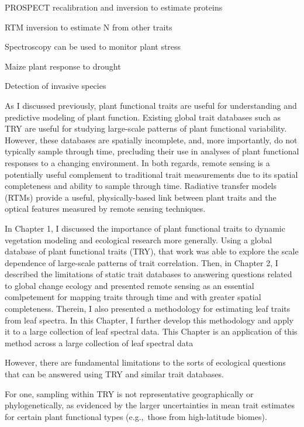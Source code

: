   PROSPECT recalibration and inversion to estimate proteins \cite{wang_2015_applicability}

  RTM inversion to estimate N from other traits \cite{wang_2015_leaf}

Spectroscopy can be used to monitor plant stress

    Maize plant response to drought \cite{sun_2018_reflectance}

Detection of invasive species \cite{ewald_2018_analyzing}



As I discussed previously, plant functional traits are useful for understanding and predictive modeling of plant function.
Existing global trait databases such as TRY are useful for studying large-scale patterns of plant functional variability.
However, these databases are spatially incomplete, and, more importantly, do not typically sample through time, precluding their use in analyses of plant functional responses to a changing environment.
In both regards, remote sensing is a potentially useful complement to traditional trait measurements due to its spatial completeness and ability to sample through time.
Radiative transfer models (RTMs) provide a useful, physically-based link between plant traits and the optical features measured by remote sensing techniques.



In Chapter 1, I discussed the importance of plant functional traits to dynamic vegetation modeling and ecological research more generally.
Using a global database of plant functional traits (TRY), that work was able to explore the scale dependence of large-scale patterns of trait correlation.
Then, in Chapter 2, I described the limitations of static trait databases to answering questions related to global change ecology and presented remote sensing as an essential comlpetement for mapping traits through time and with greater spatial completeness.
Therein, I also presented a methodology for estimating leaf traits from leaf spectra.
In this Chapter, I further develop this methodology and apply it to a large collection of leaf spectral data.
This Chapter is an application of this method across a large collection of leaf spectral data

However, there are fundamental limitations to the sorts of ecological questions that can be answered using TRY and similar trait databases.

For one, sampling within TRY is not representative geographically or phylogenetically, as evidenced by the larger uncertainties in mean trait estimates for certain plant functional types (e.g.,~those from high-latitude biomes).

